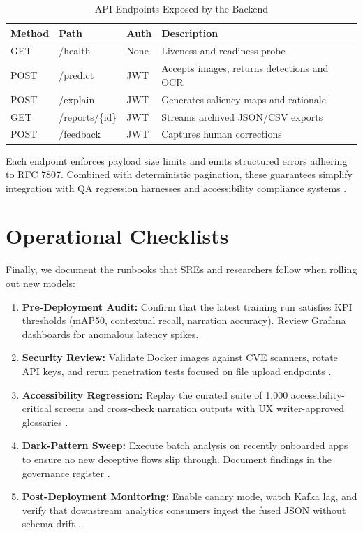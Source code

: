 \documentclass[11pt,a4paper]{report}
\begin{document}
\begin{table}[H]
    \centering
    \caption{API Endpoints Exposed by the Backend}
    \label{tab:api}
    \small
    \begin{tabular}{llll}
    	\toprule
    	\textbf{Method} & \textbf{Path} & \textbf{Auth} & \textbf{Description} \\
        \midrule
        GET & /health & None & Liveness and readiness probe \\
        POST & /predict & JWT & Accepts images, returns detections and OCR \\
        POST & /explain & JWT & Generates saliency maps and rationale \\
        GET & /reports/\{id\} & JWT & Streams archived JSON/CSV exports \\
        POST & /feedback & JWT & Captures human corrections \\
        \bottomrule
    \end{tabular}
\end{table}

Each endpoint enforces payload size limits and emits structured errors adhering to RFC 7807. Combined with deterministic pagination, these guarantees simplify integration with QA regression harnesses and accessibility compliance systems \cite{uiautomation}.

\chapter{Operational Checklists}
Finally, we document the runbooks that SREs and researchers follow when rolling out new models:
\begin{enumerate}
    \item \textbf{Pre-Deployment Audit:} Confirm that the latest training run satisfies KPI thresholds (mAP50, contextual recall, narration accuracy). Review Grafana dashboards for anomalous latency spikes.
    \item \textbf{Security Review:} Validate Docker images against CVE scanners, rotate API keys, and rerun penetration tests focused on file upload endpoints \cite{docker}.
    \item \textbf{Accessibility Regression:} Replay the curated suite of 1,000 accessibility-critical screens and cross-check narration outputs with UX writer-approved glossaries \cite{multimodalaccessibility}.
    \item \textbf{Dark-Pattern Sweep:} Execute batch analysis on recently onboarded apps to ensure no new deceptive flows slip through. Document findings in the governance register \cite{darkpatterns}.
    \item \textbf{Post-Deployment Monitoring:} Enable canary mode, watch Kafka lag, and verify that downstream analytics consumers ingest the fused JSON without schema drift \cite{uiautomation}.
\end{enumerate}
\end{document}
